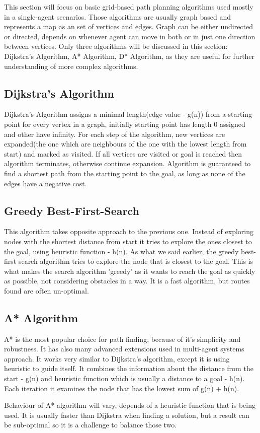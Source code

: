 
This section will focus on basic grid-based path planning algorithms used mostly in a single-agent scenarios. Those algorithms are usually graph based and represents a map as an set of vertices and edges. Graph can be either undirected or directed, depends on whenever agent can move in both or in just one direction between vertices\cite{basic_algorithms}. Only three algorithms will be discussed in this section: Dijkstra's Algorithm, A* Algorithm, D* Algorithm, as they are useful for further understanding of more complex algorithms.

\subsection{Dijkstra's Algorithm}
Dijkstra's Algorithm assigns a minimal length(edge value - g(n)) from a starting point for every vertex in a graph, initially starting point has length 0 assigned and other have infinity. For each step of the algorithm, new vertices are expanded(the one which are neighbours of the one with the lowest length from start) and marked as visited. If all vertices are visited or goal is reached then algorithm terminates, otherwise continue expansion\cite{basic_algorithms}. Algorithm is guaranteed to find a shortest path from the starting point to the goal, as long as none of the edges have a negative cost\cite{basic_2}.

\subsection{Greedy Best-First-Search}
This algorithm takes opposite approach to the previous one. Instead of exploring nodes with the shortest distance from start it tries to explore the ones closest to the goal, using heuristic function - h(n).
As what we said earlier, the greedy best-first search algorithm tries to explore the node that is closest to the goal. This is what makes the search algorithm 'greedy' as it wants to reach the goal as quickly as possible, not considering obstacles in a way. It is a fast algorithm, but routes found are often un-optimal.

\subsection{A* Algorithm}
A* is the most popular choice for path finding, because of it's simplicity and robustness. It has also many advanced extensions used in multi-agent systems approach. It works very similar to Dijkstra's algorithm, except it is using heuristic to guide itself. It combines the information about the distance from the start - g(n) and heuristic function which is usually a distance to a goal - h(n). Each iteration it examines the node that has the lowest sum of g(n) + h(n)\cite{basic_2}.

Behaviour of A* algorithm will vary, depends of a heuristic function that is being used. It is usually faster than Dijkstra when finding a solution, but a result can be sub-optimal so it is a challenge to balance those two.
